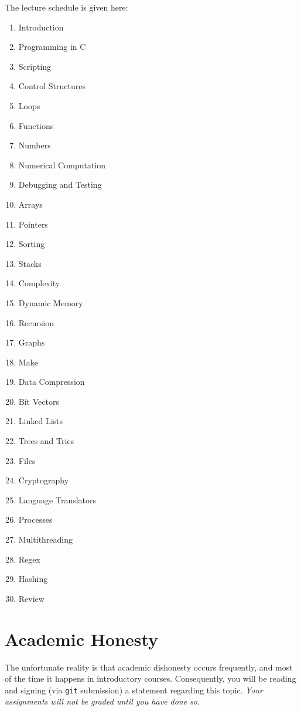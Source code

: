 \documentclass[12pt]{article}
\begin{document}
The lecture schedule is given here:

\begin{multicols}{3}
  \begin{enumerate}[label*=(\arabic*)]
  \item Introduction
  \item Programming in C
  \item Scripting
  \item Control Structures
  \item Loops
  \item Functions
  \item Numbers
  \item Numerical Computation
  \item Debugging and Testing
  \item Arrays
  \item Pointers
  \item Sorting
  \item Stacks
  \item Complexity
  \item Dynamic Memory
  \item Recursion
  \item Graphs
  \item Make
  \item Data Compression
  \item Bit Vectors
  \item Linked Lists
  \item Trees and Tries
  \item Files
  \item Cryptography
  \item Language Translators
  \item Processes
  \item Multithreading
  \item Regex
  \item Hashing
  \item Review
  \end{enumerate}
\end{multicols}

\section{Academic Honesty}

The unfortunate reality is that academic dishonesty occurs frequently, and most
of the time it happens in introductory courses. Consequently, you will be
reading and signing (via \texttt{git} submission) a statement regarding this
topic. \emph{Your assignments will not be graded until you have done so.}
\end{document}
